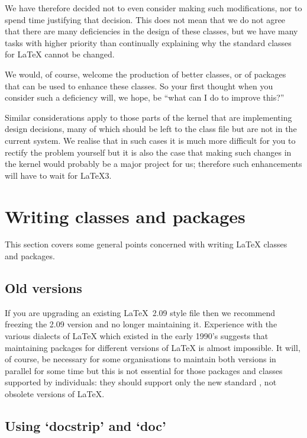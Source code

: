 \documentclass[11pt]{ltxguide}[1995/11/28]
\begin{document}
We have therefore decided not to even consider making such
modifications, nor to spend time justifying that decision.  This does
not mean that we do not agree that there are many deficiencies in the
design of these classes, but we have many tasks with higher priority
than continually explaining why the standard classes for \LaTeX{}
cannot be changed.

We would, of course, welcome the production of better classes, or of
packages that can be used to enhance these classes.  So your first
thought when you consider such a deficiency will, we hope, be ``what
can I do to improve this?''

Similar considerations apply to those parts of the kernel that are
implementing design decisions, many of which should be left to the
class file but are not in the current system.  We realise that in such
cases it is much more difficult for you to rectify the problem
yourself but it is also the case that making such changes in the
kernel would probably be a major project for us; therefore such
enhancements will have to wait for \LaTeX3.

\section{Writing classes and packages}
\label{Sec:writing}

This section covers some general points concerned with writing
\LaTeX{} classes and packages.


\subsection{Old versions}

If you are upgrading an existing \LaTeX~2.09 style file then we
recommend freezing the 2.09 version and no longer maintaining it.
Experience with the various dialects of \LaTeX{} which existed in the
early 1990's suggests that maintaining packages for different versions
of \LaTeX{} is almost impossible.  It will, of course, be necessary
for some organisations to maintain both versions in parallel for some
time but this is not essential for those packages and classes
supported by individuals: they should support only the new standard
\LaTeXe{}, not obsolete versions of \LaTeX{}.


\subsection{Using `docstrip' and `doc'}
\end{document}
